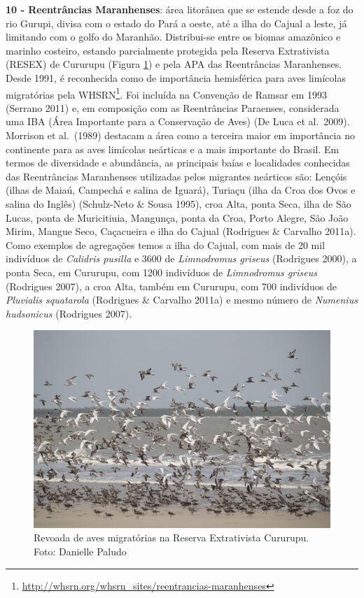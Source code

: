 \documentclass[
  oneside]{scrbook}
\DeclareRobustCommand{\href}[2]{#2\footnote{\url{#1}}}
\begin{document}
\textbf{10 - Reentrâncias Maranhenses}: área litorânea que se estende desde a foz do rio Gurupi, divisa com o estado do Pará a oeste, até a ilha do Cajual a leste, já limitando com o golfo do Maranhão. Distribui-se entre os biomas amazônico e marinho costeiro, estando parcialmente protegida pela Reserva Extrativista (RESEX) de Cururupu (Figura \ref{fig:22}) e pela APA das Reentrâncias Maranhenses. Desde 1991, é \href{http://whsrn.org/whsrn_sites/reentrancias-maranhenses}{reconhecida como de importância hemisférica para aves limícolas migratórias pela WHSRN}. Foi incluída na Convenção de Ramsar em 1993 (Serrano 2011) e, em composição com as Reentrâncias Paraenses, considerada uma IBA (Área Importante para a Conservação de Aves) (De Luca et al.~2009). Morrison et al.~(1989) destacam a área como a terceira maior em importância no continente para as aves limícolas neárticas e a mais importante do Brasil. Em termos de diversidade e abundância, as principais baías e localidades conhecidas das Reentrâncias Maranhenses utilizadas pelos migrantes neárticos são: Lençóis (ilhas de Maiaú, Campechá e salina de Iguará), Turiaçu (ilha da Croa dos Ovos e salina do Inglês) (Schulz-Neto \& Sousa 1995), croa Alta, ponta Seca, ilha de São Lucas, ponta de Muricitiuia, Mangunça, ponta da Croa, Porto Alegre, São João Mirim, Mangue Seco, Caçacueira e ilha do Cajual (Rodrigues \& Carvalho 2011a). Como exemplos de agregações temos a ilha do Cajual, com mais de 20 mil indivíduos de \emph{Calidris pusilla} e 3600 de \emph{Limnodromus griseus} (Rodrigues 2000), a ponta Seca, em Cururupu, com 1200 indivíduos de \emph{Limnodromus griseus} (Rodrigues 2007), a croa Alta, também em Cururupu, com 700 indivíduos de \emph{Pluvialis squatarola} (Rodrigues \& Carvalho 2011a) e mesmo número de \emph{Numenius hudsonicus} (Rodrigues 2007).

\begin{figure}[H]

{\centering \includegraphics[width=0.75\linewidth]{imagens/cap07/Figura_7.2} 

}

\caption{Revoada de aves migratórias na Reserva Extrativista Cururupu. Foto: Danielle Paludo}\label{fig:22}
\end{figure}
\end{document}
